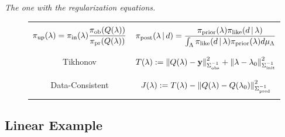 \begin{frame}[t]{\it The one with the regularization equations.}
\centering
\begin{figure}
\centering

\begin{table}[htbp]
\centering

\begin{tabular}{|c|c|}
\hline
  & \\
  $\displaystyle \operatorname*{\pi_{up}}(\lambda) = \operatorname*{\pi_{in}}(\lambda) \frac{\operatorname*{\pi_{ob}}(Q(\lambda))}{\operatorname*{\pi_{pr}}(Q(\lambda))}$
&
  $\displaystyle \pi_{\text{post}}(\lambda\,|\,d) = \frac{\pi_{\text{prior}}(\lambda)\pi_\text{like}(d\,|\,\lambda)}{\int_{\Lambda} \pi_\text{like}(d\, |\, \lambda)  \pi_{\text{prior}}(\lambda) d\mu_{{\Lambda}}}$
\\ \\
\hline
  & \\
  Tikhonov & $T(\lambda):=\left\Vert Q(\lambda)-\mathbf{y}\right\Vert_{\Sigma_\text{obs}^{-1}}^2 +
      \left\Vert\lambda-\lambda_0\right\Vert_{\Sigma_\text{init}^{-1}}^2$
  \\ & \\ \hline & \\
  Data-Consistent & $J(\lambda):=T(\lambda) - \left\Vert Q(\lambda)-Q(\lambda_0)\right\Vert_{\Sigma_\text{pred}^{-1}}^2$
\\
& \\
  \hline
\end{tabular}
%
%
  \label{tab:func_comparisons}
\end{table}


\end{figure}

\end{frame}



\subsection{Linear Example}

